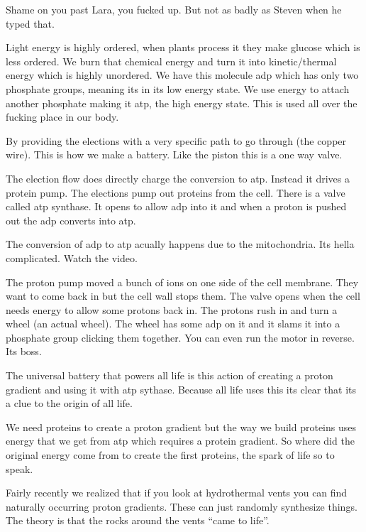 \documentclass{article}
\begin{document}
Shame on you past Lara, you fucked up. But not as badly as Steven when he typed that.


Light energy is highly ordered, when plants process it they make glucose which is less ordered. We burn that chemical energy and turn it into kinetic/thermal energy which is highly unordered. We have this molecule adp which has only two phosphate groups, meaning its in its low energy state. We use energy to attach another phosphate making it atp, the high energy state. This is used all over the fucking place in our body.


By providing the elections with a very specific path to go through (the copper wire). This is how we make a battery. Like the piston this is a one way valve.


The election flow does directly charge the conversion to atp. Instead it drives a protein pump. The elections pump out proteins from the cell. There is a valve called atp synthase. It opens to allow adp into it and when a proton is pushed out the adp converts into atp.


The conversion of adp to atp acually happens due to the mitochondria. Its hella complicated. Watch the video.


The proton pump moved a bunch of ions on one side of the cell membrane. They want to come back in but the cell wall stops them. The valve opens when the cell needs energy to allow some protons back in. The protons rush in and turn a wheel (an actual wheel). The wheel has some adp on it and it slams it into a phosphate group clicking them together. You can even run the motor in reverse. Its boss.


The universal battery that powers all life is this action of creating a proton gradient and using it with atp sythase. Because all life uses this its clear that its a clue to the origin of all life.



We need proteins to create a proton gradient but the way we build proteins uses energy that we get from atp which requires a protein gradient. So where did the original energy come from to create the first proteins, the spark of life so to speak.

Fairly recently we realized that if you look at hydrothermal vents you can find naturally occurring proton gradients. These can just randomly synthesize things. The theory is that the rocks around the vents ``came to life''.
\end{document}
